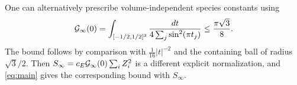 One can alternatively prescribe volume-independent species constants
using
\begin{equation}
 \mathcal G_\infty(0)=\int_{[-1/2,1/2]^3}
 \frac{dt}{4\sum_j\sin^2(\pi t_j)}
 \le\frac{\pi\sqrt3}{8}.
 \label{eq:green-infinite}
\end{equation}
The bound follows by comparison with
$\frac1{16}|t|^{-2}$ and the containing ball of radius $\sqrt3/2$.
Then $S_\infty=c_E\mathcal G_\infty(0)\sum_iZ_i^2$ is a different
explicit normalization, and \eqref{eq:main} gives the
corresponding bound with $S_\infty$.
